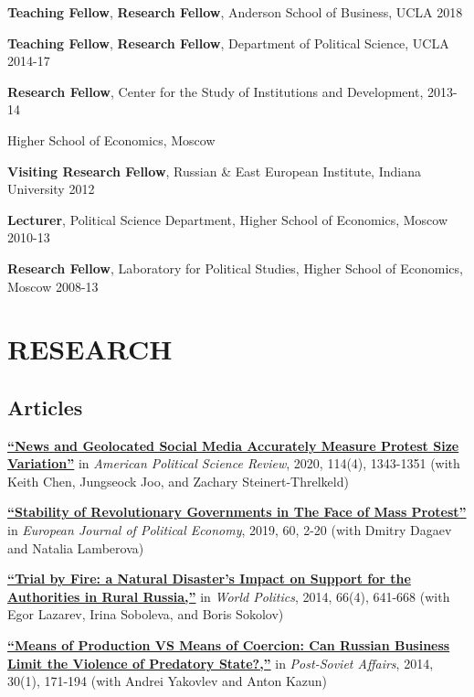 \documentclass[11pt,]{article}
\begin{document}
\textbf{Teaching Fellow}, \textbf{Research Fellow}, Anderson School of
Business, UCLA \hfill 2018

\textbf{Teaching Fellow}, \textbf{Research Fellow}, Department of
Political Science, UCLA \hfill 2014-17

\textbf{Research Fellow}, Center for the Study of Institutions and
Development, \hfill 2013-14

Higher School of Economics, Moscow

\textbf{Visiting Research Fellow}, Russian \& East European Institute,
Indiana University \hfill 2012

\textbf{Lecturer}, Political Science Department, Higher School of
Economics, Moscow \hfill 2010-13

\textbf{Research Fellow}, Laboratory for Political Studies, Higher
School of Economics, Moscow \hfill 2008-13

\hypertarget{research}{%
\section{RESEARCH}\label{research}}

\hypertarget{articles}{%
\subsection{Articles}\label{articles}}

\href{https://doi.org/10.1017/S0003055420000295}{\textbf{``News and
Geolocated Social Media Accurately Measure Protest Size Variation''}} in
\emph{American Political Science Review}, 2020, 114(4), 1343-1351 (with
Keith Chen, Jungseock Joo, and Zachary Steinert-Threlkeld)

\href{https://doi.org/10.1016/j.ejpoleco.2019.08.003}{\textbf{``Stability
of Revolutionary Governments in The Face of Mass Protest''}} in
\emph{European Journal of Political Economy}, 2019, 60, 2-20 (with
Dmitry Dagaev and Natalia Lamberova)

\href{http://dx.doi.org/10.1017/S0043887114000215}{\textbf{``Trial by
Fire: a Natural Disaster's Impact on Support for the Authorities in
Rural Russia,''}} in \emph{World Politics}, 2014, 66(4), 641-668 (with
Egor Lazarev, Irina Soboleva, and Boris Sokolov)

\href{http://www.tandfonline.com/doi/full/10.1080/1060586X.2013.859434}{\textbf{``Means
of Production VS Means of Coercion: Can Russian Business Limit the
Violence of Predatory State?,''}} in \emph{Post-Soviet Affairs}, 2014,
30(1), 171-194 (with Andrei Yakovlev and Anton Kazun)
\end{document}
